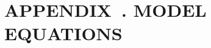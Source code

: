 \documentclass[11pt]{book}
\def\startP{188}         %
\def\startF{0}           %
\def\startT{0}           %
\begin{document}
\setcounter{page}{\startP}
\setcounter{figure}{\startF}
\setcounter{table}{\startT}
\setcounter{secnumdepth}{3}    %
\setlength{\tabcolsep}{3pt}   %


\setlength{}
\setlength{}
\def\LT@startpbox#1{%
  \bgroup
  \color@begingroup%
    \let\@footnotetext\LT@p@ftntext
    \setlength\hsize{#1}%
    \@arrayparboxrestore
   \everypar{%
      \vrule \@height \ht\@arstrutbox \@width \z@
      \everypar{}}%
}

\setcounter{chapter}{5}    %
\renewcommand{\thechapter}{\Alph{chapter}} %
\renewcommand{\thesection}{\thechapter.\arabic{section}.}
\renewcommand{\thesubsection}{\thechapter.\arabic{section}.\arabic{subsection}.}
\renewcommand{\thesubsubsection}{\thechapter.\arabic{section}.\arabic{subsection}.\arabic{subsubsection}.}
\renewcommand{\thesubsubsubsection}{\thechapter.\arabic{section}.\arabic{subsection}.\arabic{subsubsection}.\arabic{subsubsubsection}.}
\renewcommand{\thetable}{\thechapter.\arabic{table}}    
\renewcommand{\thefigure}{\thechapter.\arabic{figure}}  
\renewcommand{\theequation}{\thechapter.\arabic{equation}}

\setcounter{prevchapter}{\value{chapter}}
\addtocounter{prevchapter}{-1}
\newcommand{\eqnchapter}{\Alph{prevchapter}}

\def\finalYr{2023}  %
\def\ncomm{2}       %
\def\nsurv{6}       %
\def\gsurv{3,...,8}     %
\def\gcomm{1,...,2}     %
\def\ugees{1,3,4,5}     %
\def\qgees{1,3,...,8}     %

\newcommand{\spn}{Canary Rockfish}
\newcommand{\spc}{CAR}


\chapter*{APPENDIX~\thechapter. MODEL EQUATIONS}
\end{document}
